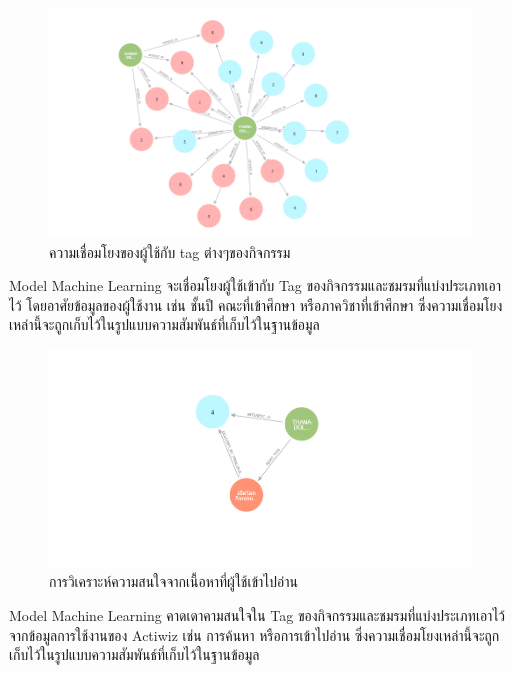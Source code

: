 \documentclass[14pt,oneside,openright,a4paper]{cpe-thai-project}
\begin{document}
\begin{figure}[!h]\centering
  \includegraphics[width=12cm]{./Pictures/user-tag.png}
  \caption{ความเชื่อมโยงของผู้ใช้กับ tag ต่างๆของกิจกรรม}\label{fig:TagUser}
\end{figure}
 \hspace*{1cm} Model Machine Learning จะเชื่อมโยงผู้ใช้เข้ากับ Tag ของกิจกรรมและชมรมที่แบ่งประเภทเอาไว้ โดยอาศัยข้อมูลของผู้ใช้งาน เช่น ชั้นปี คณะที่เข้าศึกษา หรือภาควิชาที่เข้าศึกษา ซึ่งความเชื่อมโยงเหล่านี้จะถูกเก็บไว้ในรูปแบบความสัมพันธ์ที่เก็บไว้ในฐานข้อมูล

\begin{figure}[!h]\centering
  \includegraphics[width=12cm]{./Pictures/triangle.png}
  \caption{การวิเคราะห์ความสนใจจากเนื้อหาที่ผู้ใช้เข้าไปอ่าน}\label{fig:Triangle}
\end{figure}
  \hspace*{1cm} Model Machine Learning คาดเดาคามสนใจใน Tag ของกิจกรรมและชมรมที่แบ่งประเภทเอาไว้ จากข้อมูลการใช้งานของ Actiwiz เช่น การค้นหา หรือการเข้าไปอ่าน ซึ่งความเชื่อมโยงเหล่านี้จะถูกเก็บไว้ในรูปแบบความสัมพันธ์ที่เก็บไว้ในฐานข้อมูล

\newpage
\end{document}
